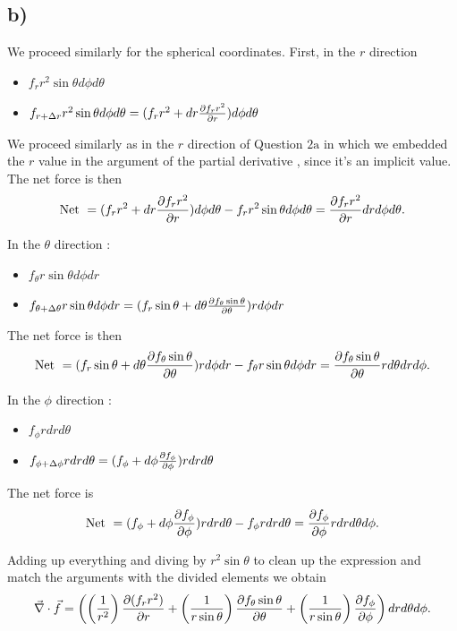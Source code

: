 \documentclass[
	12pt,
	]{article}
\theoremstyle{definition}
\theoremstyle{definition}
\theoremstyle{definition}
\theoremstyle{definition}
\theoremstyle{definition}
\theoremstyle{example}
\theoremstyle{note}
\theoremstyle{remark}
\theoremstyle{example}
\begin{document}
		   		 \subsection*{b) }
		   		 
		   		 \noindent We proceed similarly for the spherical coordinates. First, in the $r$ direction 
		   		 \begin{itemize}
		   		 	\item $f_{r}r^{2}\sin \theta d \phi d\theta$ 
		   		 	\item $f_{r+ \Delta r} r^{2}\sin\theta d\phi d\theta  = (f_{r}r^{2}+dr\pdv{f_{r}r^{2}}{r}) d\phi d\theta$
		   		 \end{itemize}
		   		 We proceed similarly as in the $r$ direction of Question $2 \text{a}$ in which we embedded the $r$ value in the argument of the partial derivative , since it's an implicit value. The net force is then 
		   		 $$ \text{Net } = (f_{r}r^{2}+dr\pdv{f_{r}r^{2}}{r}) d\phi d\theta - f_{r}r^{2}\sin \theta d \phi d\theta = \pdv{f_{r}r^{2}}{r} dr d\phi d\theta.$$
		   		 
		   		 In the $\theta $ direction :
		   		 \begin{itemize}
		   		 	\item $f_{\theta} r\sin \theta d\phi dr $
		   		 	\item $f_{\theta + \Delta \theta} r\sin \theta d\phi dr = (f_{r}\sin\theta + d\theta \pdv{f_{\theta }\sin\theta}{\theta}) r d\phi dr$
		   		 \end{itemize}
		   		 The net force is then 
		   		 $$ \text{Net } = (f_{r}\sin\theta + d\theta \pdv{f_{\theta }\sin\theta}{\theta}) r d\phi dr - f_{\theta} r\sin \theta d\phi dr  = \pdv{f_{\theta}\sin\theta}{\theta} r d\theta dr d\phi .$$
		   		 
		   		 In the $\phi $ direction : 
		   		 \begin{itemize}
		   		 	\item $f_{\phi} r dr d\theta$ 
		   		 	\item $f_{\phi + \Delta \phi}r dr d\theta = (f_{\phi} + d\phi \pdv{f_{\phi}}{\phi})r drd\theta$
		   		 \end{itemize}
		   		 The net force is 
		   		 $$ \text{Net } = (f_{\phi} + d\phi \pdv{f_{\phi}}{\phi})r drd\theta - f_{\phi} r dr d\theta = \pdv{f_{\phi}}{\phi} r dr d\theta d\phi.$$
		   		 
		   		 \noindent Adding up everything and diving by $r^{2}\sin\theta$ to clean up the expression and match the arguments with the divided elements we obtain 
		   		 \begin{equation} 
		   		  \vec{\nabla}\cdot \vec{f} = \left(\left(\frac{1}{r^{2}}\right)\pdv{(f_{r}r^{2})}{r} + \left(\frac{1}{r \sin\theta}\right) \pdv{f_{\theta}\sin \theta}{\theta} + \left(\frac{1}{r\sin \theta}\right) \pdv{f_{\phi}}{\phi}\right) dr d\theta d\phi.
		   		  \end{equation}
\end{document}
